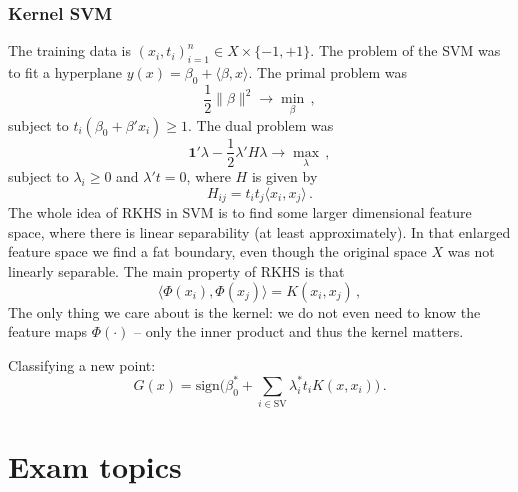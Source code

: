\documentclass[a4paper]{article}
\newcommand{\one}{\mathbf{1}}
\begin{document}

\subsubsection{Kernel SVM} %
\label{ssub:kernel_svm}

The training data is $(x_i,t_i)_{i=1}^n \in X\times \{-1,+1\}$. The problem of the
SVM was to fit a hyperplane $y(x) = \beta_0 + \langle\beta, x\rangle$.
The primal problem was
\[ \frac{1}{2}\|\beta\|^2 \to \min_\beta\,, \]
subject to $t_i (\beta_0 + \beta'x_i )\geq 1$.
The dual problem was
\[ \one'\lambda - \frac{1}{2} \lambda'H \lambda \to \max_\lambda\,, \]
subject to $\lambda_i \geq 0$ and $\lambda't = 0$, where $H$ is given by
\[ H_{ij} = t_i t_j \langle x_i,x_j\rangle\,. \]
The whole idea of RKHS in SVM is to find some larger dimensional feature space,
where there is linear separability (at least approximately). In that enlarged
feature space we find a fat boundary, even though the original space $X$ was not
linearly separable. The main property of RKHS is that
\[ \langle \Phi(x_i),\Phi(x_j) \rangle = K(x_i,x_j)\,, \]
The only thing we care about is the kernel: we do not even need to know the feature
maps $\Phi(\cdot)$ -- only the inner product and thus the kernel matters.

Classifying a new point:
\[ G(x) = \text{sign} \bigl( \beta_0^* + \sum_{i\in \text{SV}} \lambda^*_i t_i K(x,x_i) \bigr)\,. \]




\section{Exam topics} %
\label{sec:exam_topics}
\end{document}
